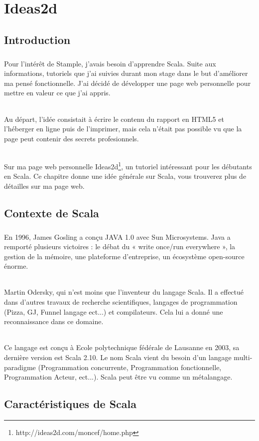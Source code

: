 \chapter{Ideas2d}
\section{Introduction}
\paragraph{}
Pour l'intérêt de Stample, j'avais besoin d'apprendre Scala.
Suite aux informations, tutoriels que j'ai suivies durant mon stage dans le but d'améliorer ma pensé fonctionnelle. J'ai décidé de développer une page web personnelle pour mettre en valeur ce que j'ai appris.
\subparagraph{}
Au départ, l'idée consistait à écrire le contenu du rapport en HTML5 et l'héberger en ligne puis de l'imprimer, mais cela n'était pas possible vu que la page peut contenir des secrets profesionnels. 
\subparagraph{}
Sur ma page web personnelle Ideas2d\footnote{http://ideas2d.com/moncef/home.php}, un tutoriel intéressant pour les débutants en Scala.
Ce chapitre donne une idée générale sur Scala, vous trouverez plus de détailles sur ma page web.
\section{Contexte de Scala}
\paragraph{}
En 1996, James Gosling a conçu JAVA 1.0 avec Sun Microsystems.
Java a remporté plusieurs victoires : le débat du « write once/run everywhere », la gestion de la mémoire, une plateforme d'entreprise, un écosystème open-source énorme.
\subparagraph{}
Martin Odersky, qui n'est moins que l'inventeur du langage Scala. Il a effectué dans d'autres travaux de recherche scientifiques, langages de programmation (Pizza, GJ, Funnel langage ect...) et compilateurs. Cela lui a donné une reconnaissance dans ce domaine.
\subparagraph{}
Ce langage est conçu à  Ecole polytechnique fédérale de Lausanne en 2003, sa dernière version est Scala 2.10.\newline
Le nom Scala vient du besoin d'un langage multi-paradigme (Programmation concurrente, Programmation fonctionnelle, Programmation Acteur, ect...). Scala peut être vu comme un métalangage.
\section{Caractéristiques de Scala}

